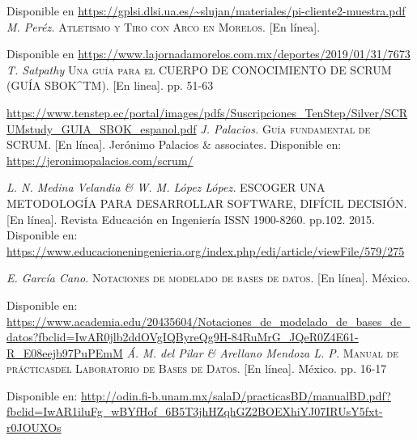 \begin{thebibliography}{}
	\linebreak
	Disponible en 
	\url{https://gplsi.dlsi.ua.es/~slujan/materiales/pi-cliente2-muestra.pdf}
	\textit{M. Peréz.}
	\textsc{Atletismo y Tiro con Arco en Morelos.} [En línea].
	
	\linebreak
	Disponible en 
	\url{https://www.lajornadamorelos.com.mx/deportes/2019/01/31/7673}
	\textit{T. Satpathy}
	\textsc{Una guía para el CUERPO DE CONOCIMIENTO DE SCRUM (GUÍA SBOK^{TM}).} [En linea]. pp. 51-63 
	
	\linebreak
	\url{https://www.tenstep.ec/portal/images/pdfs/Suscripciones_TenStep/Silver/SCRUMstudy_GUIA_SBOK_espanol.pdf}
	\textit{J. Palacios.}
	\textsc{Guía fundamental de SCRUM.} [En línea]. 
	Jerónimo Palacios \& associates. 
	\linebreak
	Disponible en: 
	\url{https://jeronimopalacios.com/scrum/}
	
	\textit{L. N. Medina Velandia \& W. M. López López.}
	\textsc{ESCOGER UNA METODOLOGÍA PARA DESARROLLAR SOFTWARE, DIFÍCIL DECISIÓN.} [En línea]. 
	Revista Educación en Ingeniería ISSN 1900-8260. pp.102. 2015. 
	\linebreak
	Disponible en: 
	\url{https://www.educacioneningenieria.org/index.php/edi/article/viewFile/579/275}
	
	\textit{E. García Cano.}
	\textsc{Notaciones de modelado de bases de datos.} [En línea]. México.
	
	\linebreak
	Disponible en:
	\url{https://www.academia.edu/20435604/Notaciones_de_modelado_de_bases_de_datos?fbclid=IwAR0jlb2ddOVgIQByreQg9H-84RuMrG_JQeR0Z4E61-R_E08eejb97PuPEmM}
	\textit{Á. M. del Pilar \& Arellano Mendoza L. P.}
	\textsc{Manual de prácticasdel Laboratorio de Bases de Datos.} [En línea]. México. pp. 16-17
	
	\linebreak
	Disponible en: 
	\url{http://odin.fi-b.unam.mx/salaD/practicasBD/manualBD.pdf?fbclid=IwAR1iluFg_wBYfHof_6B5T3jhHZqhGZ2BOEXhiYJ07IRUsY5fxt-r0JOUXOs}	
	
\end{thebibliography}
